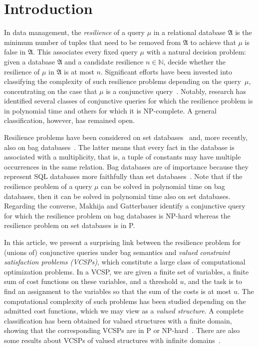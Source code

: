 \documentclass[nonacm]{acmart}
\newcommand{\N}{\mathbb N}
\newcommand{\bA}{{\mathfrak A}}
\begin{document}
\section{Introduction}
 In data management, the \emph{resilience} of a query $\mu$ in a 
 relational database $\bA$ is the minimum number of tuples that need to be removed from $\bA$ to achieve that $\mu$ is false in $\bA$. This associates every fixed query $\mu$ with a natural decision
 problem:
given a database $\bA$ and a candidate resilience  $n \in \N$, decide whether the
resilience of $\mu$ in $\bA$ is at most $n$.
 Significant efforts have been invested into classifying the  
complexity of such resilience problems depending on the query~$\mu$, concentrating on the case that $\mu$ is a conjunctive query~\cite{Resilience,NewResilience, LatestResilience}. Notably,
research has identified several classes
of conjunctive queries for which the 
resilience problem is in polynomial time and others for which it is NP-complete.
A general classification, however, has remained open. 

Resilience problems have been considered 
 on set databases~\cite{Resilience,NewResilience} and, more recently, also on bag databases~\cite{LatestResilience}.
The latter means that every fact in the 
database is associated with a multiplicity,
that is, a tuple of constants may have multiple occurrences in the same relation.
Bag databases are of importance because they represent SQL databases
 more faithfully than set databases~\cite{bag-semantics}. Note that if the resilience problem of a query $\mu$ can be solved in polynomial time on bag databases, then it can be solved in polynomial time also on set databases. 
Regarding the converse, Makhija and Gatterbauer \cite{LatestResilience} identify a conjunctive query for which the resilience problem on bag databases is NP-hard whereas the resilience problem on set databases is in P.

In this article, we present a surprising link between the resilience problem for (unions of) conjunctive queries under bag semantics
and \emph{valued constraint satisfaction problems (VCSPs)}, which constitute 
a large class of computational optimization problems. In a VCSP, we are given a finite set of variables, a finite sum of cost functions on these variables, and a threshold $u$, and the task is to 
find an assignment to the variables so that the sum of the costs is at most $u$.
The computational complexity of such problems has been studied depending on the admitted cost functions, which 
we may view as a \emph{valued structure}. 
A complete classification has been obtained for valued structures with a finite domain, showing that the corresponding VCSPs are in P or NP-hard~\cite{KozikOchremiak15,KolmogorovKR17,BulatovFVConjecture,ZhukFVConjecture,Zhuk20}. There are also some  results about VCSPs of valued structures with infinite domains~\cite{BodirskyMaminoViola-Journal,ViolaZivny}.
\end{document}
